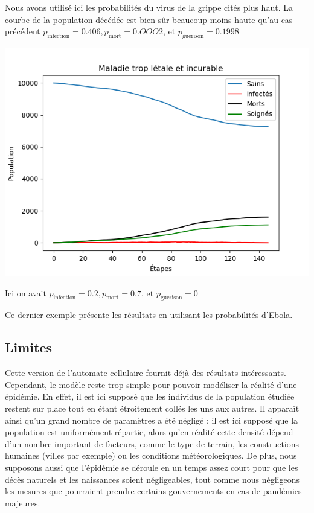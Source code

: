 \documentclass{article}
\begin{document}
	Nous avons utilisé ici les probabilités du virus de la grippe cités plus haut. La courbe de la population décédée est bien sûr beaucoup moins haute qu'au cas précédent $p_{\text{infection}} = 0.406, p_{\text{mort}} = 0.OOO2$, et $p_{\text{guerison}} = 0.1998$


\includegraphics[scale=1]{../images/Figure_3.png}

Ici on avait $p_{\text{infection}} = 0.2, p_{\text{mort}} = 0.7$, et $p_{\text{guerison}} = 0$



Ce dernier exemple présente les résultats en utilisant les probabilités d'Ebola.
\subsection{Limites}
	Cette version de l'automate cellulaire fournit déjà des résultats intéressants. Cependant, le modèle reste trop simple pour pouvoir modéliser la réalité d'une épidémie. En effet, il est ici supposé que les individus de la population étudiée restent sur place tout en étant étroitement collés les uns aux autres.
Il apparaît ainsi qu'un grand nombre de paramètres a été négligé : il est ici supposé que la population est uniformément répartie, alors qu'en réalité cette densité dépend d'un nombre important de facteurs, comme le type de terrain, les constructions humaines (villes par exemple) ou les conditions météorologiques. De plus, nous supposons aussi que l'épidémie se déroule en un temps assez court pour que les décès naturels et les naissances soient négligeables, tout comme nous négligeons les mesures que pourraient prendre certains gouvernements en cas de pandémies majeures.
	
\end{document}
